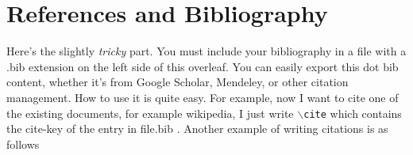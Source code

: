 \documentclass[11pt,a4paper]{article}
\begin{document}
\begin{table}[h]
\caption{Contoh Tabel}
\label{tab-contoh}
\centering
{}
\end{table}

\section{References and Bibliography}
Here's the slightly \textit{tricky} part. You must include your bibliography in a file with a .bib extension on the left side of this overleaf. You can easily export this dot bib content, whether it's from Google Scholar, Mendeley, or other citation management.
How to use it is quite easy.
For example, now I want to cite one of the existing documents, for example wikipedia, I just write $\backslash${\tt{cite}} which contains the cite-key of the entry in file.bib \cite{Wikipedia_contributors2021-bb}. Another example of writing citations is as follows \cite{Name2018-hd}
\newpage


\end{document}
